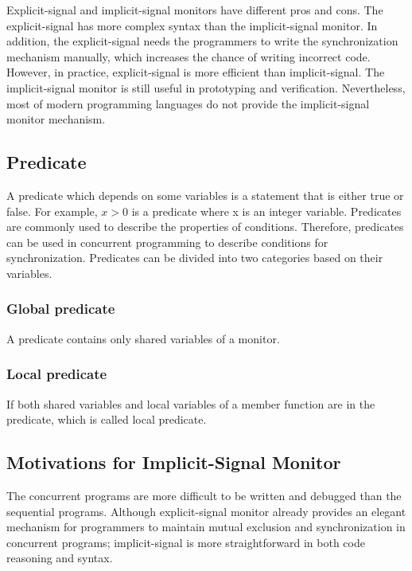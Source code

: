 \documentclass[10pt, conference, compsocconf]{IEEEtran}
\begin{document}
Explicit-signal and implicit-signal monitors have different pros and cons. The 
explicit-signal has more complex syntax than the implicit-signal monitor. In 
addition, the explicit-signal needs the programmers to write the synchronization
mechanism manually, which increases the chance of writing incorrect code. 
However, in practice, explicit-signal is more efficient than implicit-signal. 
The implicit-signal monitor is still useful in prototyping and verification. 
Nevertheless, most of modern programming languages do not provide the 
implicit-signal monitor mechanism.

\subsection{Predicate}
A predicate which depends on some variables is a statement that is either true
or false. For example, $x > 0$ is a predicate where x is an integer variable. 
Predicates are commonly used to describe the properties of conditions. 
Therefore, predicates can be used in concurrent programming to describe 
conditions for synchronization. Predicates can be divided into two categories
based on their variables.
\subsubsection{Global predicate} A predicate contains only shared variables of a
    monitor. 
\subsubsection{Local predicate} If both shared variables and local variables of a
    member function are in the predicate, which is called local predicate. 



\subsection{Motivations for Implicit-Signal Monitor}
The concurrent programs are more difficult to be written and debugged than the 
sequential programs. Although explicit-signal monitor already provides an 
elegant mechanism for programmers to maintain mutual exclusion and synchronization 
in concurrent programs; implicit-signal is more straightforward in both code
reasoning and syntax. 
\end{document}
